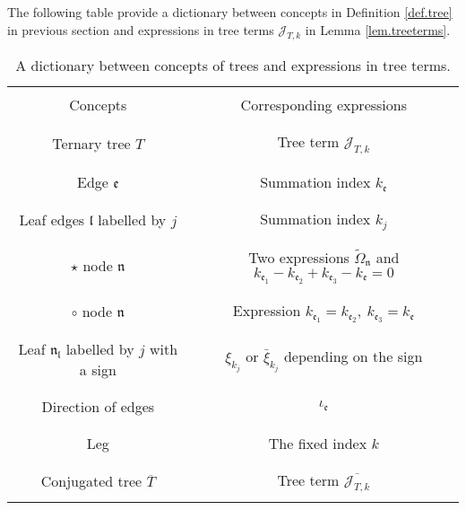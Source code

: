 The following table provide a dictionary between concepts in Definition \ref{def.tree} in previous section and expressions in tree terms $\mathcal{J}_{T,k}$ in Lemma \ref{lem.treeterms}.

\begin{table}[H]
\begin{center}
    \begin{longtable}{|c|c|}
    \hline
          &   \\
     Concepts    &  Corresponding expressions \\
          &   \\
    \hline
          &   \\
     Ternary tree $T$    &  Tree term $\mathcal{J}_{T,k}$\\
          &   \\
    \hline
          &   \\
     Edge $\mathfrak{e}$    &  Summation index $k_{\mathfrak{e}}$\\
          &   \\
    \hline
              &   \\
     Leaf edges $\mathfrak{l}$ labelled by $j$    &  Summation index $k_{j}$\\
          &   \\
    \hline
                 &   \\
     $\star$ node $\mathfrak{n}$    & Two expressions $\widetilde{\Omega}_{\mathfrak{n}}$ and $k_{\mathfrak{e}_1}-k_{\mathfrak{e}_2}+k_{\mathfrak{e}_3}-k_{\mathfrak{e}}=0$\\
          &   \\
    \hline
                 &   \\
     $\circ$ node $\mathfrak{n}$    &   Expression $k_{\mathfrak{e}_1}=k_{\mathfrak{e}_2},\ k_{\mathfrak{e}_3}=k_{\mathfrak{e}}$\\
          &   \\
    \hline
                 &   \\
     Leaf $\mathfrak{n}_{\mathfrak{l}}$ labelled by $j$ with a sign  &  $\xi_{k_j}$ or $\bar{\xi}_{k_j}$ depending on the sign\\
          &   \\
    \hline
                 &   \\
     Direction of edges    &  $\iota_{\mathfrak{e}}$\\
          &   \\
    \hline
                 &   \\
     Leg    &  The fixed index $k$\\
          &   \\
    \hline
                 &   \\
     Conjugated tree $\overline{T}$    &  Tree term $\overline{\mathcal{J}_{T,k}}$ \\
          &   \\
    \hline
    \end{longtable}
\end{center}
\caption{\label{tab.dict} A dictionary between concepts of trees and expressions in tree terms.}
\end{table}

